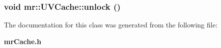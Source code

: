 \subsubsection{\setlength{\rightskip}{0pt plus 5cm}void mr::UVCache::unlock ()\hspace{0.3cm}{\tt  [inline]}}\label{classmr_1_1UVCache_a3}




The documentation for this class was generated from the following file:\begin{CompactItemize}
\item 
{\bf mr\-Cache.h}\end{CompactItemize}
